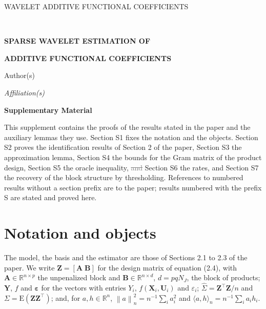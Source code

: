 \documentclass[10pt]{book}
\theoremstyle{definition}
\newcommand{\R}{\mathbb{R}}
\newcommand{\E}{\mathrm{E}}
\newcommand{\T}{^{\top}}
\newcommand{\normn}[1]{\left\lVert #1 \right\rVert_{n}}
\newcommand{\inner}[2]{\langle #1, #2 \rangle}
\newcommand{\NJ}{N_{J}}
\newcommand{\bX}{\mathbf{X}}
\newcommand{\bU}{\mathbf{U}}
\newcommand{\bZ}{\mathbf{Z}}
\newcommand{\Gram}{\Sigma}
\newcommand{\Gramhat}{\widehat{\Sigma}}
\newcommand{\Amat}{\mathbf{A}}
\newcommand{\Bmat}{\mathbf{B}}
\newcommand{\bveps}{\boldsymbol{\varepsilon}}
\newcommand{\bY}{\mathbf{Y}}
\begin{document}
\renewcommand{\baselinestretch}{2}


{\hfill {\footnotesize\rm WAVELET ADDITIVE FUNCTIONAL COEFFICIENTS} \hfill}

\renewcommand{\thefootnote}{}
$\ $\par \fontsize{12}{14pt plus.8pt minus .6pt}\selectfont


\centerline{\large\bf SPARSE WAVELET ESTIMATION OF}
\vspace{2pt}
\centerline{\large\bf ADDITIVE FUNCTIONAL COEFFICIENTS}
\vspace{.25cm}
\centerline{Author(s)}
\vspace{.4cm}
\centerline{\it Affiliation(s)}
\vspace{.55cm}
\centerline{\bf Supplementary Material}
\vspace{.55cm}
\fontsize{9}{11.5pt plus.8pt minus .6pt}\selectfont
\noindent
This supplement contains the proofs of the results stated in the paper and
the auxiliary lemmas they use. Section S1 fixes the notation and the objects.
Section S2 proves the identification results of Section 2 of the paper,
Section S3 the approximation lemma, Section S4 the bounds for the Gram matrix
of the product design, Section S5 the oracle inequality, \textcolor{gray}{\sout{and}} Section S6 the
rates\textcolor{colR1}{, and Section S7 the recovery of the block structure by
thresholding}. References to numbered results without a section prefix are to the
paper; results numbered with the prefix S are stated and proved here.
\par

\setcounter{section}{0}
\setcounter{equation}{0}
\def\theequation{S\arabic{section}.\arabic{equation}}
\def\thesection{S\arabic{section}}

\fontsize{12}{14pt plus.8pt minus .6pt}\selectfont

\section{Notation and objects}

The model, the basis and the estimator are those of Sections 2.1 to 2.3 of the
paper. We write $\bZ = [\Amat\;\Bmat]$ for the design matrix of equation
(2.4), with $\Amat \in \R^{n\times p}$ the unpenalized block and
$\Bmat \in \R^{n\times d}$, $d = pq\NJ$, the block of products; $\bY$, $f$ and
$\bveps$ for the vectors with entries $Y_i$, $f(\bX_i,\bU_i)$ and
$\varepsilon_i$; $\Gramhat = \bZ\T\bZ/n$ and $\Gram = \E(\bZ\bZ\T)$; and, for
$a, h \in \R^n$, $\normn{a}^2 = n^{-1}\sum_i a_i^2$ and
$\inner{a}{h}_n = n^{-1}\sum_i a_ih_i$.
\end{document}
